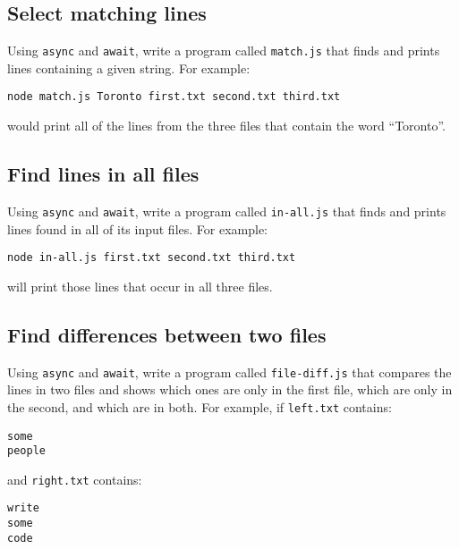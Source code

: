 \documentclass[krantzl]{krantz}
\begin{document}
\vspace{\baselineskip}

\subsection*{Select matching lines}


Using \texttt{async} and \texttt{await},
write a program called \texttt{match.js} that finds and prints lines containing a given string.
For example:

\begin{lstlisting}[frame=tblr]
node match.js Toronto first.txt second.txt third.txt
\end{lstlisting}


\noindent would print all of the lines from the three files that contain the word “Toronto”.

\subsection*{Find lines in all files}


Using \texttt{async} and \texttt{await},
write a program called \texttt{in-all.js} that finds and prints lines found in all of its input files.
For example:

\begin{lstlisting}[frame=tblr]
node in-all.js first.txt second.txt third.txt
\end{lstlisting}


\noindent will print those lines that occur in all three files.

\subsection*{Find differences between two files}


Using \texttt{async} and \texttt{await},
write a program called \texttt{file-diff.js}
that compares the lines in two files
and shows which ones are only in the first file,
which are only in the second,
and which are in both.
For example,
if \texttt{left.txt} contains:

\begin{lstlisting}[frame=tblr]
some
people
\end{lstlisting}


\noindent and \texttt{right.txt} contains:

\begin{lstlisting}[frame=tblr]
write
some
code
\end{lstlisting}
\end{document}
